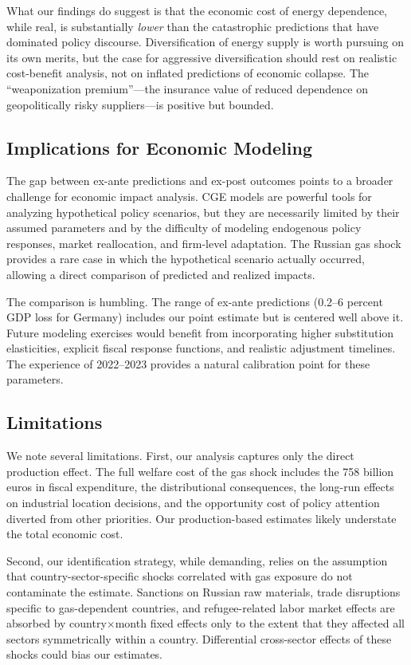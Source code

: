 \documentclass[12pt]{article}
\begin{document}
What our findings do suggest is that the economic cost of energy dependence, while real, is substantially \textit{lower} than the catastrophic predictions that have dominated policy discourse. Diversification of energy supply is worth pursuing on its own merits, but the case for aggressive diversification should rest on realistic cost-benefit analysis, not on inflated predictions of economic collapse. The ``weaponization premium''---the insurance value of reduced dependence on geopolitically risky suppliers---is positive but bounded.

\subsection{Implications for Economic Modeling}

The gap between ex-ante predictions and ex-post outcomes points to a broader challenge for economic impact analysis. CGE models are powerful tools for analyzing hypothetical policy scenarios, but they are necessarily limited by their assumed parameters and by the difficulty of modeling endogenous policy responses, market reallocation, and firm-level adaptation. The Russian gas shock provides a rare case in which the hypothetical scenario actually occurred, allowing a direct comparison of predicted and realized impacts.

The comparison is humbling. The range of ex-ante predictions (0.2--6 percent GDP loss for Germany) includes our point estimate but is centered well above it. Future modeling exercises would benefit from incorporating higher substitution elasticities, explicit fiscal response functions, and realistic adjustment timelines. The experience of 2022--2023 provides a natural calibration point for these parameters.

\subsection{Limitations}

We note several limitations. First, our analysis captures only the direct production effect. The full welfare cost of the gas shock includes the 758 billion euros in fiscal expenditure, the distributional consequences, the long-run effects on industrial location decisions, and the opportunity cost of policy attention diverted from other priorities. Our production-based estimates likely understate the total economic cost.

Second, our identification strategy, while demanding, relies on the assumption that country-sector-specific shocks correlated with gas exposure do not contaminate the estimate. Sanctions on Russian raw materials, trade disruptions specific to gas-dependent countries, and refugee-related labor market effects are absorbed by country$\times$month fixed effects only to the extent that they affected all sectors symmetrically within a country. Differential cross-sector effects of these shocks could bias our estimates.
\end{document}
